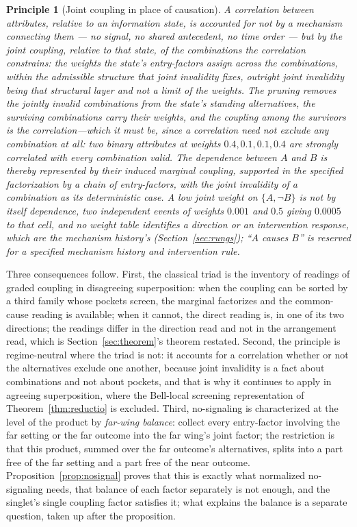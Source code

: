 \documentclass[11pt]{article}
\newtheorem{principle}{Principle}
\begin{document}
\begin{principle}[Joint coupling in place of causation]\label{prin:joint}
A correlation between attributes, relative to an information state, is accounted for not by a mechanism connecting them --- no signal, no shared antecedent, no time order --- but by the \emph{joint coupling}, relative to that state, of the combinations the correlation constrains: the weights the state's entry-factors assign across the combinations, within the admissible structure that joint invalidity fixes, outright joint invalidity being that structural layer and not a limit of the weights. The pruning removes the jointly invalid combinations from the state's standing alternatives, the surviving combinations carry their weights, and the coupling among the survivors \emph{is} the correlation---which it must be, since a correlation need not exclude any combination at all: two binary attributes at weights $0.4, 0.1, 0.1, 0.4$ are strongly correlated with every combination valid. The dependence between $A$ and $B$ is thereby represented by their induced marginal coupling, supported in the specified factorization by a chain of entry-factors, with the joint invalidity of a combination as its deterministic case. A low joint weight on $\{A, \neg B\}$ is not by itself dependence, two independent events of weights $0.001$ and $0.5$ giving $0.0005$ to that cell, and no weight table identifies a direction or an intervention response, which are the mechanism history's (Section~\ref{sec:rungs}); ``$A$ causes $B$'' is reserved for a specified mechanism history and intervention rule.
\end{principle}
\noindent Three consequences follow. First, the classical triad is the inventory of readings of graded coupling in disagreeing superposition: when the coupling can be sorted by a third family whose pockets screen, the marginal factorizes and the common-cause reading is available; when it cannot, the direct reading is, in one of its two directions; the readings differ in the direction read and not in the arrangement read, which is Section~\ref{sec:theorem}'s theorem restated. Second, the principle is regime-neutral where the triad is not: it accounts for a correlation whether or not the alternatives exclude one another, because joint invalidity is a fact about combinations and not about pockets, and that is why it continues to apply in agreeing superposition, where the Bell-local screening representation of Theorem~\ref{thm:reductio} is excluded. Third, no-signaling is characterized at the level of the product by \emph{far-wing balance}: collect every entry-factor involving the far setting or the far outcome into the far wing's joint factor; the restriction is that this product, summed over the far outcome's alternatives, splits into a part free of the far setting and a part free of the near outcome. Proposition~\ref{prop:nosignal} proves that this is exactly what normalized no-signaling needs, that balance of each factor separately is not enough, and the singlet's single coupling factor satisfies it; what explains the balance is a separate question, taken up after the proposition.
\end{document}

